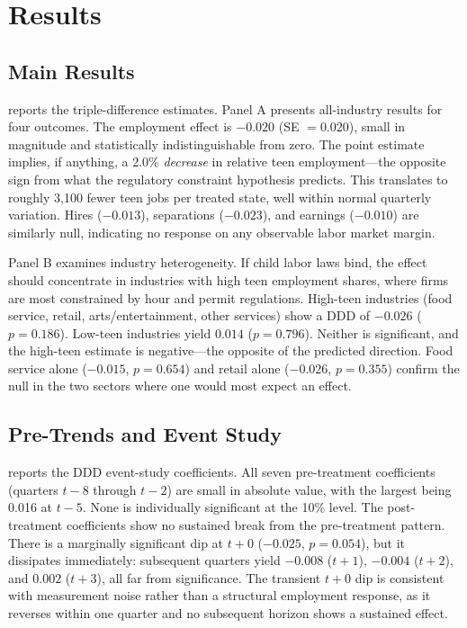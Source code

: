 \documentclass[12pt]{article}
\begin{document}
\section{Results}
\label{sec:results}

\subsection{Main Results}



 reports the triple-difference estimates. Panel A presents all-industry results for four outcomes. The employment effect is $-0.020$ (SE $= 0.020$), small in magnitude and statistically indistinguishable from zero. The point estimate implies, if anything, a 2.0\% \textit{decrease} in relative teen employment---the opposite sign from what the regulatory constraint hypothesis predicts. This translates to roughly 3,100 fewer teen jobs per treated state, well within normal quarterly variation. Hires ($-0.013$), separations ($-0.023$), and earnings ($-0.010$) are similarly null, indicating no response on any observable labor market margin.

Panel B examines industry heterogeneity. If child labor laws bind, the effect should concentrate in industries with high teen employment shares, where firms are most constrained by hour and permit regulations. High-teen industries (food service, retail, arts/entertainment, other services) show a DDD of $-0.026$ ($p = 0.186$). Low-teen industries yield $0.014$ ($p = 0.796$). Neither is significant, and the high-teen estimate is negative---the opposite of the predicted direction. Food service alone ($-0.015$, $p = 0.654$) and retail alone ($-0.026$, $p = 0.355$) confirm the null in the two sectors where one would most expect an effect.

\subsection{Pre-Trends and Event Study}



 reports the DDD event-study coefficients. All seven pre-treatment coefficients (quarters $t-8$ through $t-2$) are small in absolute value, with the largest being 0.016 at $t-5$. None is individually significant at the 10\% level. The post-treatment coefficients show no sustained break from the pre-treatment pattern. There is a marginally significant dip at $t+0$ ($-0.025$, $p = 0.054$), but it dissipates immediately: subsequent quarters yield $-0.008$ ($t+1$), $-0.004$ ($t+2$), and $0.002$ ($t+3$), all far from significance. The transient $t+0$ dip is consistent with measurement noise rather than a structural employment response, as it reverses within one quarter and no subsequent horizon shows a sustained effect.
\end{document}
